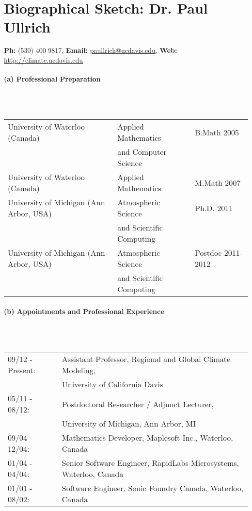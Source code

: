 \documentclass[11pt]{article}
\begin{document}
\appendix

\setcounter{section}{5}

\section*{Biographical Sketch: Dr. Paul Ullrich}

\vspace{-0.5cm}
\begin{center}
\textbf{Ph:} (530) 400 9817, \textbf{Email:} \url{paullrich@ucdavis.edu}, \textbf{Web:} \url{http://climate.ucdavis.edu}
\end{center}

\vspace{-0.8cm}
\paragraph{\large (a) Professional Preparation}\ \\ \ \\
\begin{tabular*}{\textwidth}{@{\extracolsep{\fill}}lll}
University of Waterloo (Canada) & Applied Mathematics & B.Math 2005 \\
& \qquad and Computer Science & \\
University of Waterloo (Canada) & Applied Mathematics & M.Math 2007 \\
University of Michigan (Ann Arbor, USA) & Atmospheric Science & Ph.D. 2011 \\
& \qquad and Scientific Computing & \\
University of Michigan (Ann Arbor, USA) & Atmospheric Science & Postdoc 2011-2012 \\
& \qquad and Scientific Computing & \\
\end{tabular*}

\vspace{-0.5cm}
\paragraph{\large (b) Appointments and Professional Experience}\ \\ \ \\
\begin{tabular*}{\textwidth}{@{\extracolsep{\fill}}ll}
09/12 - Present: & Assistant Professor, Regional and Global Climate Modeling, \\
& \qquad University of California Davis \\
05/11 - 08/12: & Postdoctoral Researcher / Adjunct Lecturer, \\
& \qquad University of Michigan, Ann Arbor, MI \\
09/04 - 12/04: & Mathematics Developer, Maplesoft Inc., Waterloo, Canada \\
01/04 - 04/04: & Senior Software Engineer, RapidLabs Microsystems, Waterloo, Canada \\
01/01 - 08/02: & Software Engineer, Sonic Foundry Canada, Waterloo, Canada
\end{tabular*}
\end{document}
